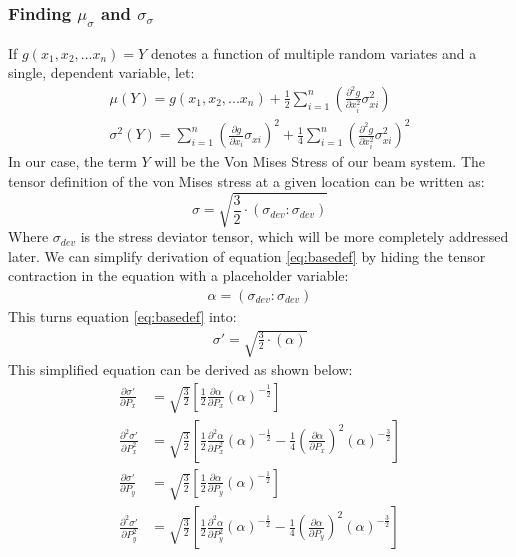 \subsubsection{Finding $\mu_\sigma$ and $\sigma_\sigma$}
If $g(x_1, x_2, ... x_n) = Y$ denotes a function of multiple random variates and a single, dependent variable, let: 
   \begin{align}
	   \mu(Y) = g(x_1, x_2, ... x_n) + \frac{1}{2} \sum_{i=1}^{n}\left( \frac{\partial^2 g}{\partial x_i^2} \sigma_{xi}^2  \right)
	            \label{eq:mu}\\
	   \sigma^2(Y) = \sum_{i=1}^{n}\left( \frac{\partial g}{\partial x_i} \sigma_{xi}  \right)^2 + 
			 \frac{1}{4} \sum_{i=1}^{n}\left( \frac{\partial^2 g}{\partial x_i^2} \sigma_{xi}^2  \right)^2 \label{eq:sigma}
   \end{align}
In our case, the term $Y$ will be the Von Mises Stress of our beam system. The tensor definition of the von Mises stress at a given location can be written as:
   \begin{equation}
      \sigma = \sqrt{\frac{3}{2} \cdot \left(\sigma_{dev}:\sigma_{dev} \right)}
	\label{eq:basedef}
   \end{equation}
Where $\sigma_{dev}$ is the stress deviator tensor, which will be more completely addressed later. 
We can simplify derivation of equation \ref{eq:basedef} by hiding the tensor contraction in the equation with a placeholder variable:
   \begin{align}
	   \alpha = (\sigma_{dev}:\sigma_{dev})
	   \label{eq:defalpha}
   \end{align}
This turns equation \ref{eq:basedef} into:
   \begin{align}
      \sigma' = \sqrt{\frac{3}{2} \cdot \left(\alpha\right)}
   \end{align}
This simplified equation can be derived as shown below: 
   \begin{align}
	   \frac{\partial \sigma'}{\partial P_x} &= \sqrt{\frac{3}{2}} \left[\frac{1}{2} \frac{\partial \alpha}{\partial P_x} 
						    \left( \alpha \right)^{-\frac{1}{2}}\right]\label{eq:fd_vmx}\\
	   \frac{\partial^2 \sigma'}{\partial P_x^2} &= \sqrt{\frac{3}{2}} \left[ \frac{1}{2}  \frac{\partial ^2 \alpha}{\partial P_x^2}
	                                                \left( \alpha \right)^{-\frac{1}{2}} - 
							\frac{1}{4}  
							\left(\frac{\partial \alpha}{\partial P_x}\right)^2
							\left( \alpha \right)^{-\frac{3}{2}}\right] \\
	   \frac{\partial \sigma'}{\partial P_y} &= \sqrt{\frac{3}{2}} \left[\frac{1}{2} \frac{\partial \alpha}{\partial P_y} 
						    \left( \alpha \right)^{-\frac{1}{2}}\right]\\
	   \frac{\partial^2 \sigma'}{\partial P_y^2} &= \sqrt{\frac{3}{2}} \left[ \frac{1}{2}  \frac{\partial ^2 \alpha}{\partial P_y^2}
	                                                \left( \alpha \right)^{-\frac{1}{2}} - 
							\frac{1}{4}   
							\left(\frac{\partial \alpha}{\partial P_y}\right)^2
							\left( \alpha \right)^{-\frac{3}{2}}\right] \label{eq:sd_vmy}
   \end{align}
